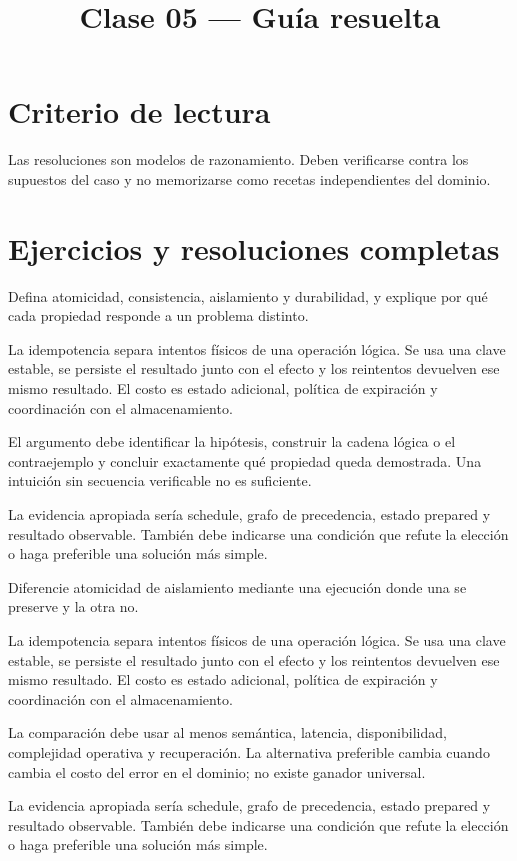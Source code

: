 \documentclass[variant=guia,cover=institutional,mode=screen]{ua-engineering-v6-article}
\title{Clase 05 --- Guía resuelta}
\author{\UAProfessor}
\date{\UADate}
\begin{document}
\section{Criterio de lectura}
Las resoluciones son modelos de razonamiento. Deben verificarse contra los supuestos del caso y no memorizarse como recetas independientes del dominio.

\section{Ejercicios y resoluciones completas}
\begin{uaexercise}
Defina atomicidad, consistencia, aislamiento y durabilidad, y explique por qué cada propiedad responde a un problema distinto.
\end{uaexercise}
\begin{uaanswer}
La idempotencia separa intentos físicos de una operación lógica. Se usa una clave estable, se persiste el resultado junto con el efecto y los reintentos devuelven ese mismo resultado. El costo es estado adicional, política de expiración y coordinación con el almacenamiento.

El argumento debe identificar la hipótesis, construir la cadena lógica o el contraejemplo y concluir exactamente qué propiedad queda demostrada. Una intuición sin secuencia verificable no es suficiente.

La evidencia apropiada sería schedule, grafo de precedencia, estado prepared y resultado observable. También debe indicarse una condición que refute la elección o haga preferible una solución más simple.
\end{uaanswer}

\begin{uaexercise}
Diferencie atomicidad de aislamiento mediante una ejecución donde una se preserve y la otra no.
\end{uaexercise}
\begin{uaanswer}
La idempotencia separa intentos físicos de una operación lógica. Se usa una clave estable, se persiste el resultado junto con el efecto y los reintentos devuelven ese mismo resultado. El costo es estado adicional, política de expiración y coordinación con el almacenamiento.

La comparación debe usar al menos semántica, latencia, disponibilidad, complejidad operativa y recuperación. La alternativa preferible cambia cuando cambia el costo del error en el dominio; no existe ganador universal.

La evidencia apropiada sería schedule, grafo de precedencia, estado prepared y resultado observable. También debe indicarse una condición que refute la elección o haga preferible una solución más simple.
\end{uaanswer}
\end{document}
